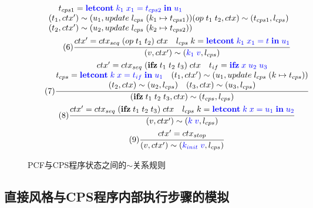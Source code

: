 \begin{figure}[htbp]
\begin{gather*}
{{\begin{matrix}
        t_{cps1} = \textcolor{blue}{\mathbf{ letcont }\; k_1\; x_1 = t_{cps2}\; \mathbf{ in }\; u_1} \\
        (t_1, ctx')\sim (u_1, update\; l_{cps}\; (k_1 \mapsto t_{cps1})) \\
        (t_2, ctx')\sim (u_2, update\; l_{cps}\; (k_2 \mapsto t_{cps2})) \end{matrix}}
        {(op\; t_1\; t_2, ctx)\sim (t_{cps1}, l_{cps})}} \\
    \tag{6} \displaystyle{\frac{\begin{matrix}
        ctx'=ctx_{seq}\; (op\; t_1\; t_2)\; ctx \quad
        l_{cps}\; k = \textcolor{blue}{\mathbf{letcont}\; k_1\; x_1 = t\; \mathbf{in}\; u_1} \end{matrix}}
        {(v, ctx')\sim (\textcolor{blue}{k_1\; v}, l_{cps})}} \\    
    \tag{7} \displaystyle{\frac{\begin{matrix}
        ctx'=ctx_{seq}\; (\mathbf{ ifz }\; t_1\; t_2\; t_3)\; ctx \quad
        t_{if} = \textcolor{blue}{\mathbf{ ifz }\; x\; u_2\; u_3} \\
        t_{cps} = \textcolor{blue}{\mathbf{letcont}\; k\; x = t_{if}\; \mathbf{in}\; u_1} \quad
        (t_1, ctx')\sim (u_1, update\; l_{cps}\; (k \mapsto t_{cps})) \\
        (t_2, ctx)\sim (u_2, l_{cps}) \quad (t_3, ctx)\sim (u_3, l_{cps}) \end{matrix}}
        {(\mathbf{ ifz }\; t_1\; t_2\; t_3, ctx)\sim (t_{cps}, l_{cps})}} \\
    \tag{8} \displaystyle{\frac{\begin{matrix}
        ctx'=ctx_{seq}\; (\mathbf{ ifz }\; t_1\; t_2\; t_3)\; ctx \quad
        l_{cps}\; k = \textcolor{blue}{\mathbf{letcont}\; k\; x = u_1\; \mathbf{in}\; u_2} \end{matrix}}
        {(v, ctx')\sim (\textcolor{blue}{k\; v}, l_{cps})}} \\
    \tag{9} \displaystyle{\frac{\begin{matrix}
        c t x' = ctx_{stop} \end{matrix}}
        {(v, ctx')\sim (\textcolor{blue}{k_{init}\; v}, l_{cps})}} \\
    \end{gather*}
    \caption{PCF与CPS程序状态之间的$\sim$关系规则}\label{simrelationcps}
\end{figure}


\subsection{直接风格与CPS程序内部执行步骤的模拟}

